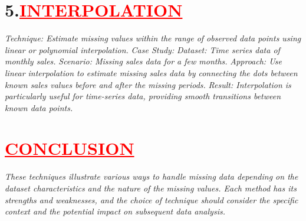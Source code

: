 \documentclass[12pt]{article}
\begin{document}
\section*{\textbf{\hspace{1cm}5.\hspace{1cm}\textcolor{red}{\underline{\large{INTERPOLATION}}}}}
\hspace{1cm}\large{\emph{Technique: Estimate missing values within the range of observed data points using linear or polynomial interpolation.}}\vspace{0.25cm}\newline
\hspace{1cm}\large{\emph{Case Study:}}\vspace{0.25cm}\newline
\hspace{1cm}\large{\emph{Dataset: Time series data of monthly sales.}}\vspace{0.25cm}\newline
\hspace{1cm}\large{\emph{Scenario: Missing sales data for a few months.}}\vspace{0.25cm}\newline
\hspace{1cm}\large{\emph{Approach: Use linear interpolation to estimate missing sales data by connecting the dots between known sales values before and after the missing periods.}}\vspace{0.25cm}\newline
\hspace{1cm}\large{\emph{Result: Interpolation is particularly useful for time-series data, providing smooth transitions between known data points.}}\vspace{0.25cm}\newline

\section*{\textbf{\textcolor{red}{\underline{\huge{CONCLUSION}}}}}
\hspace{1cm}\large{\emph{These techniques illustrate various ways to handle missing data depending on the dataset characteristics and the nature of the missing values. Each method has its strengths and weaknesses, and the choice of technique should consider the specific context and the potential impact on subsequent data analysis.}}
\end{document}

